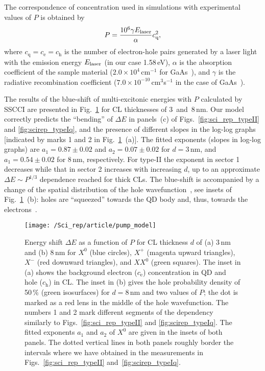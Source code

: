 The correspondence of concentration used in simulations with experimental values of $P$ is obtained by~\cite{Kuokstis2002}
%
\begin{equation}
\label{eq:conc_to_P_recalc}
P=\frac{10^6\gamma E_{\rm laser}}{\alpha}c_\mathrm{q}^2,
\end{equation}
where $c_\mathrm{q}=c_\mathrm{e}=c_\mathrm{h}$ is the number of electron-hole pairs generated by a laser light with the emission energy $E_{\rm laser}$ (in our case 1.58$\,$eV), $\alpha$ is the absorption coefficient of the sample material ($2.0\times 10^4$$\,$cm$^{-1}$ for GaAs~\cite{landoltbornstein}), and $\gamma$ is the radiative recombination coefficient ($7.0\times 10^{-10}$$\,$cm$^3$s$^{-1}$ in the case of GaAs~\cite{landoltbornstein}).

The results of the blue-shift of multi-excitonic energies with $P$ calculated by SSCCI are presented in Fig.~\ref{fig:scirep_pumpmodel} for CL thicknesses of 3~and~8$\,$nm. Our model correctly predicts the \enquote{bending} of $\Delta E$ in panels~(c) of Figs.~\ref{fig:sci_rep_typeII} and \ref{fig:scirep_typeIq}, and the presence of different slopes in the log-log graphs [indicated by marks 1 and 2 in Fig.~\ref{fig:scirep_pumpmodel}~(a)].  The fitted exponents (slopes in log-log graphs) are $a_1=0.87\pm0.02$ and $a_2=0.07\pm0.02$ for $d=$3$\,$nm, and $a_1=0.54\pm0.02$ for 8$\,$nm, respectively. For type-II the exponent in sector 1 decreases while that in sector 2 increases with increasing $d$, up to an approximate $\Delta E\sim P^{1/3}$ dependence reached for thick CLs. The blue-shift is accompanied by a change of the spatial distribution of the hole wavefunction~\cite{Gradkowski2012}, see insets of Fig.~\ref{fig:scirep_pumpmodel}~(b): holes are \enquote{squeezed} towards the QD body and, thus, towards the electrons~\cite{Gradkowski2012,Llorens2015}. 
%
\begin{figure}
	\centering
	\texttt{[image: /Sci\_rep/article/pump\_model]}
	\caption{Energy shift $\Delta E$ as a function of $P$ for CL thickness $d$ of (a) 3$\,$nm and (b) 8$\,$nm for $X^0$ (blue circles), $X^+$ (magenta upward triangles), $X^-$ (red downward triangles), and $XX^0$ (green squares). The inset in (a) shows the background electron ($c_\mathrm{e}$) concentration in QD and hole ($c_\mathrm{h}$) in CL. The inset in (b) gives the hole probability density of 50$\,$\% (green isosurfaces) for $d=8$$\,$nm and two values of $P$; the dot is marked as a red lens in the middle of the hole wavefunction. The numbers 1 and 2 mark different segments of the dependency similarly to Figs.~\ref{fig:sci_rep_typeII} and \ref{fig:scirep_typeIq}. The fitted exponents $a_1$ and $a_2$ of $X^0$ are given in the insets of both panels. The dotted vertical lines in both panels roughly border the intervals where we have obtained in the measurements in Figs.~\ref{fig:sci_rep_typeII}  and~\ref{fig:scirep_typeIq}.}
	\label{fig:scirep_pumpmodel}
\end{figure}

